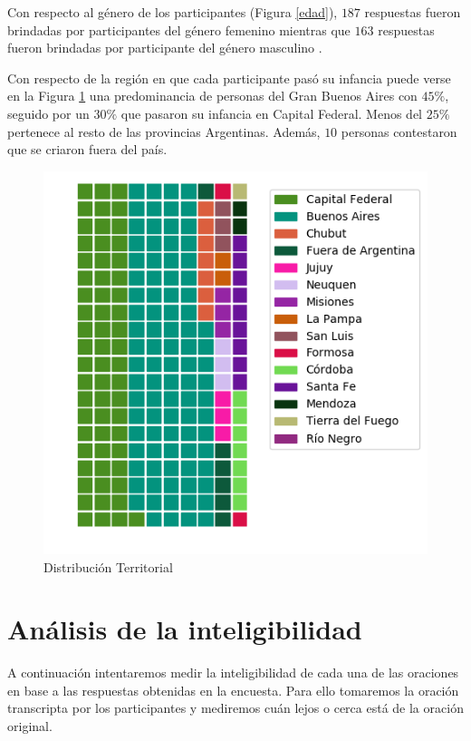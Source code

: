 Con respecto al género de los participantes (Figura \ref{edad}), $187$ respuestas fueron brindadas por participantes del género femenino mientras que $163$ respuestas fueron brindadas por participante del género masculino .

Con respecto de la región en que cada participante pasó su infancia puede verse en la Figura \ref{distTerritorial} una predominancia de personas del Gran Buenos Aires con $45\%$, seguido por un $30\%$ que pasaron su infancia en Capital Federal. Menos del $25\%$ pertenece al resto de las provincias Argentinas. Además, $10$ personas contestaron que se criaron fuera del país.

\begin{figure}
\begin{center}
\includegraphics[scale=0.8]{datosDemograficos/infancia.png}
\end{center}
\caption{Distribución Territorial}
\label{distTerritorial}
\end{figure}

\section{Análisis de la inteligibilidad}\label{SeccionInteligibilidad}

A continuación intentaremos medir la inteligibilidad de cada una de las oraciones en base a las respuestas obtenidas en la encuesta. Para ello tomaremos la oración transcripta por los participantes y mediremos cuán lejos o cerca está de la oración original. 

